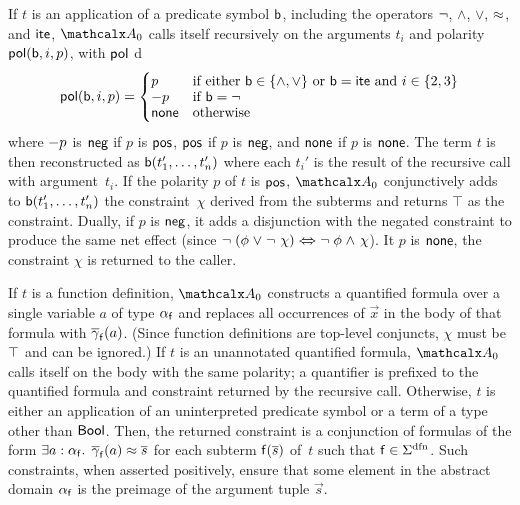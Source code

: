 If $t$ is an application of a predicate symbol $\mathsf{b}$, including the
operators ${\oldneg}$, ${\wedge}$, ${\vee}$, ${\approx}$, and ${\mathsf{ite}}$,
$\conv_0$ calls itself recursively on the arguments $t_i$ and polarity $\mathsf{pol}(
\mathsf{b}, i, p )$, with $\mathsf{pol}$ d
\[\pol( \boolop, i, p ) =
\begin{cases}
p & \text{if either $\boolop \in \{{\wedge}, {\vee}\}$ or $\boolop = \lite$ and $i \in \{2, 3\}$} \\[-\jot]
\pnegate p & \text{if $\boolop = {\neg}$} \\[-\jot]
\pnone & \text{otherwise}
\end{cases}\]
where $- p$ is $\mathsf{neg}$ if $p$ is $\mathsf{pos}$, $\mathsf{pos}$
if $p$ is $\mathsf{neg}$, and $\mathsf{none}$ if $p$ is $\mathsf{none}$.
The term $t$ is then reconstructed as $\mathsf{b}(t_1',\dotsc,t_n')$
where each $t_i'$ is the result of the recursive call with argument~$t_i$.
If the polarity $p$ of $t$ is $\mathsf{pos}$,
$\conv_0$ conjunctively adds to $\mathsf{b}(t_1',\dotsc,t_n')$ the constraint~$\chi$ derived from
the subterms and returns $\top$ as the constraint.
Dually, if $p$ is $\mathsf{neg}$, it adds a
disjunction with the negated constraint to produce the same net effect
(since $\lnot\;(\phi \mathrel\lor \lnot\;\chi) \Medleftrightarrow \lnot\;\phi \mathrel\land \chi$).
It $p$ is $\mathsf{none}$, the constraint $\chi$ is
returned to the caller.

If $t$ is a function definition, %
$\conv_0$ constructs a quantified formula over a single variable
$a$ of type $\alpha_{\mathsf{f}}$ and replaces all occurrences of $\vec x$ in
the body of that formula with $\overline{\gamma}_{\mathsf{f}}( a )$.
(Since function definitions are top-level conjuncts, %
$\chi$ must be $\top$ and can be ignored.)
%
If $t$ is an unannotated quantified formula, $\conv_0$ calls itself
on the body with the same polarity; a quantifier is prefixed to the
quantified formula and constraint returned by the recursive call.
Otherwise, $t$ is either an application of an uninterpreted predicate symbol or a term
of a type other than $\mathsf{Bool}$. Then, the returned constraint is a conjunction of
formulas of the form $\exists a : {\alpha_{\mathsf{f}}}.\;\, \overline{\gamma}_{\mathsf{f}}(
a ) \approx \overline{s}$ for each subterm $\mathsf{f}( \overline{s} )$ of~$t$ such that $\con{f}
\in \sfundefs{\Sigma}$. Such constraints, when asserted positively, ensure that
some element in the abstract domain $\alpha_{\mathsf{f}}$ is the preimage of
the argument tuple $\vec s$. %

